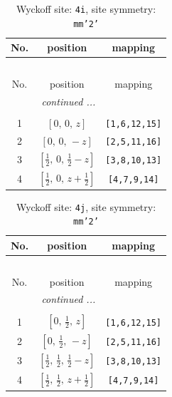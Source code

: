 \documentclass[fleqn,8pt]{jsarticle}
\begin{document}
\renewcommand{\arraystretch}{1.2}
\begin{longtable}{ccc}
\caption{Wyckoff site: {\tt 4i}, site symmetry: {\tt mm'2'}}
 \\
 \hline \hline
No. & position & mapping \\ \hline \endfirsthead

\multicolumn{2}{l}{\tablename\ \thetable{}} \\
 \hline \hline
No. & position & mapping \\ \hline \endhead

 \hline \hline
\multicolumn{2}{r}{\footnotesize\it continued ...} \\ \endfoot

 \hline \hline
\multicolumn{2}{r}{} \\ \endlastfoot

1 & $\left[ 0,\, 0,\, z \right]$ & {\tt [1,6,12,15]} \\ \hline
2 & $\left[ 0,\, 0,\, - z \right]$ & {\tt [2,5,11,16]} \\ \hline
3 & $\left[ \frac{1}{2},\, 0,\, \frac{1}{2} - z \right]$ & {\tt [3,8,10,13]} \\ \hline
4 & $\left[ \frac{1}{2},\, 0,\, z + \frac{1}{2} \right]$ & {\tt [4,7,9,14]} \\
\end{longtable}
\renewcommand{\arraystretch}{1.2}
\begin{longtable}{ccc}
\caption{Wyckoff site: {\tt 4j}, site symmetry: {\tt mm'2'}}
 \\
 \hline \hline
No. & position & mapping \\ \hline \endfirsthead

\multicolumn{2}{l}{\tablename\ \thetable{}} \\
 \hline \hline
No. & position & mapping \\ \hline \endhead

 \hline \hline
\multicolumn{2}{r}{\footnotesize\it continued ...} \\ \endfoot

 \hline \hline
\multicolumn{2}{r}{} \\ \endlastfoot

1 & $\left[ 0,\, \frac{1}{2},\, z \right]$ & {\tt [1,6,12,15]} \\ \hline
2 & $\left[ 0,\, \frac{1}{2},\, - z \right]$ & {\tt [2,5,11,16]} \\ \hline
3 & $\left[ \frac{1}{2},\, \frac{1}{2},\, \frac{1}{2} - z \right]$ & {\tt [3,8,10,13]} \\ \hline
4 & $\left[ \frac{1}{2},\, \frac{1}{2},\, z + \frac{1}{2} \right]$ & {\tt [4,7,9,14]} \\
\end{longtable}
\end{document}
